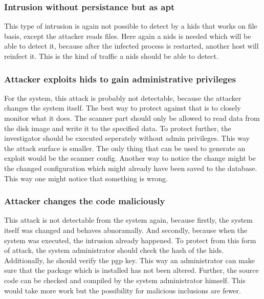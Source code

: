 \subsubsection{Intrusion without persistance but as apt}
\label{sec:defense:nopersistanceapt}

This type of intrusion is again not possible to detect by a \gls{hids} that works on file basis, except the attacker reads files. Here again a \gls{nids} is needed which will be able to detect it, because after the infected process is restarted, another host will reinfect it. This is the kind of traffic a \gls{nids} should be able to detect.

\subsubsection{Attacker exploits \gls{hids} to gain administrative privileges}
\label{sec:defense:exploitforroot}

For the system, this attack is probably not detectable, because the attacker changes the system itself. The best way to protect against that is to closely monitor what it does. The scanner part should only be allowed to read data from the disk image and write it to the specified data. To protect further, the investigator should be executed seperately without admin privileges. This way the attack surface is smaller. The only thing that can be used to generate an exploit would be the scanner config. Another way to notice the change might be the changed configuration which might already have been saved to the database. This way one might notice that something is wrong.

\subsubsection{Attacker changes the code maliciously}
\label{sec:defense:codechange}

This attack is not detectable from the system again, because firstly, the system itself was changed and behaves abnoramally. And secondly, because when the system was executed, the intrusion already happened. To protect from this form of attack, the system administrator should check the hash of the \gls{hids}. Additionally, he should verify the \gls{pgp} key. This way an administrator can make sure that the package which is installed has not been altered. Further, the source code can be checked and compiled by the system administrator himself. This would take more work but the possibility for malicious inclusions are fewer. 

